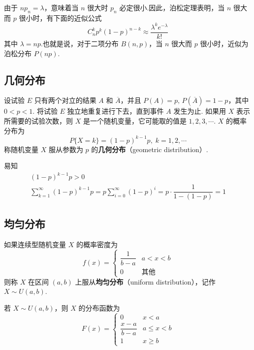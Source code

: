 由于 $n p_n=\lambda$，意味着当 $n$ 很大时 $p_n$ 必定很小.因此，泊松定理表明，当 $n$ 很大而 $p$ 很小时，有下面的近似公式
$$
C_n^k p^k (1-p)^{n-k}\approx \dfrac{\lambda^k e^{-\lambda}}{k!}
$$
其中 $\lambda=np$.也就是说，对于二项分布 $B(n,p)$，当 $n$ 很大而 $p$ 很小时，近似为泊松分布 $P(np)$.

\subsection{几何分布}

设试验 $E$ 只有两个对立的结果 $A$ 和 $\overline{A}$，并且 $P(A)=p, \, P(\overline{A})=1-p$，其中 $0<p<1$. 将试验 $E$ 独立地重复进行下去，直到事件 $A$ 发生为止. 如果用 $X$ 表示所需要的试验次数，则 $X$ 是一个随机变量，它可能取的值是 $1,2,3,\cdots$. $X$ 的概率分布为
$$
P\{X=k\}=(1-p)^{k-1} p, \; k=1,2,\cdots
$$
称随机变量 $X$ 服从参数为 $p$ 的\textbf{几何分布}（geometric distribution）.

易知
\begin{gather*}
    (1-p)^{k-1} p > 0\\
    \sum_{k=1}^\infty (1-p)^{k-1} p = p \sum_{i=0}^\infty (1-p)^i = p \cdot \dfrac{1}{1-(1-p)} = 1    
\end{gather*}

\subsection{均匀分布}

\begin{definition}
    如果连续型随机变量 $X$ 的概率密度为
    $$
    f(x)=\begin{cases}
        \dfrac{1}{b-a} & a<x<b \\[0.5em]
        0 & \text{其他}
    \end{cases}
    $$
    则称 $X$ 在区间 $(a,b)$ 上服从\textbf{均匀分布}（uniform distribution），记作 $X \sim U(a,b)$.
\end{definition}

若 $X \sim U(a,b)$，则 $X$ 的分布函数为
$$
F(x)=\begin{cases}
    0 & x<a \\[0.2em]
    \dfrac{x-a}{b-a} & a \leqslant x < b \\[0.5em]
    1 & x \geqslant b
\end{cases}
$$

